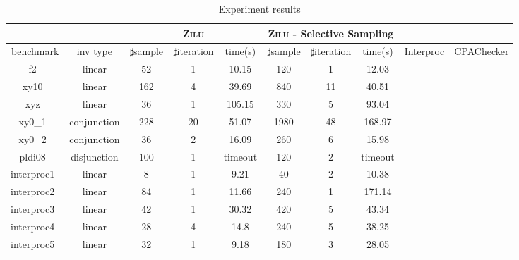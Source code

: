 \begin{table}[t]
\scriptsize
\centering
\caption{Experiment results}
\begin{tabular}{l c | c c c | c c c | c c }
\cline{3-8}
& &\multicolumn{3}{|c|}{\textsc{Zilu}}&\multicolumn{3}{c|}{\textsc{Zilu} - Selective Sampling} & & \\
\hline
\multicolumn{1}{|c|}{benchmark}&\multicolumn{1}{|c|}{inv type}& $\sharp$sample & $\sharp$iteration & time(s) & $\sharp$sample & $\sharp$iteration &time(s) & \multicolumn{1}{|c|}{Interproc} & \multicolumn{1}{|c|}{CPAChecker} \\
\hline %
\multicolumn{1}{|c|}{f2~\cite{albarghouthi2013beautiful}}         				&linear 		&52 &1 &10.15  			&120 &1   &12.03  			& &  \\
\multicolumn{1}{|c|}{xy10~\cite{albarghouthi2013beautiful}} 	        		&linear 		&162 &4 &39.69  		&840  &11  &40.51  			& &  \\
\multicolumn{1}{|c|}{xyz~\cite{albarghouthi2013beautiful}}   	      			&linear 		&36 &1 &105.15  		&330  &5  &93.04  			& &  \\
\multicolumn{1}{|c|}{xy0\_1~\cite{albarghouthi2013beautiful}}         			&conjunction 	&228 &20 &51.07			&1980 &48 &168.97  			& &  \\
\multicolumn{1}{|c|}{xy0\_2~\cite{albarghouthi2013beautiful}}         			&conjunction 	&36  &2 &16.09			&260 &6 &15.98  			& &  \\
\multicolumn{1}{|c|}{pldi08~\cite{albarghouthi2013beautiful}} 		        	&disjunction 	&100 &1 &timeout  		&120  &2  &timeout  		& &  \\

\multicolumn{1}{|c|}{interproc1~\cite{jeannet2010interproc}}         			&linear 		&8 &1 &9.21  			&40 &2   &10.38  			& &  \\
\multicolumn{1}{|c|}{interproc2~\cite{jeannet2010interproc}}         			&linear 		&84 &1 &11.66  			&240  &1  &171.14  			& &  \\
\multicolumn{1}{|c|}{interproc3~\cite{jeannet2010interproc}}         			&linear 		&42 &1 &30.32  			&420 &5   &43.34  			& &  \\
\multicolumn{1}{|c|}{interproc4~\cite{jeannet2010interproc}}         			&linear 		&28 &4 &14.8  			&240 &5   &38.25  			& &  \\
\multicolumn{1}{|c|}{interproc5~\cite{jeannet2010interproc}}         			&linear 		&32 &1 &9.18  			&180 &3   &28.05  			& &  \\


\end{tabular}
\end{table}
